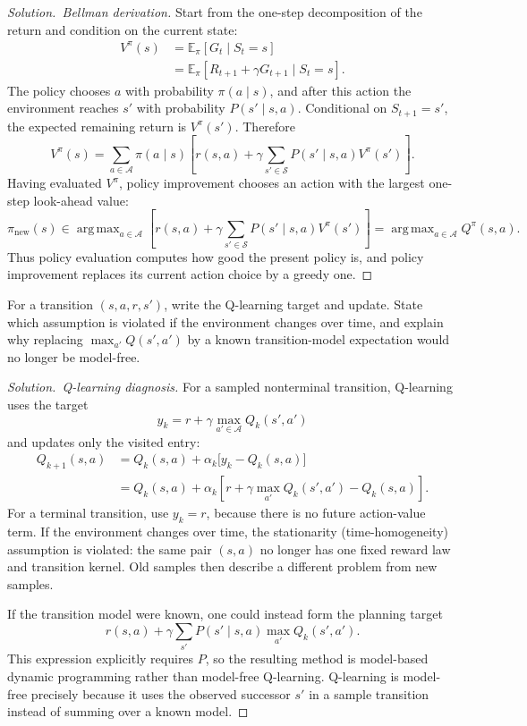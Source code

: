 \documentclass[11pt,a4paper]{article}
\DeclareMathOperator*{\argmax}{arg\,max}
\theoremstyle{definition}
\newenvironment{solution}[1][]{\begin{proof}[Solution.\ #1]}{\end{proof}}
\begin{document}
\begin{solution}[Bellman derivation]
Start from the one-step decomposition of the return and condition on the current state:
\[
\begin{aligned}
V^\pi(s)
&=\mathbb{E}_\pi[G_t\mid S_t=s]\\
&=\mathbb{E}_\pi[R_{t+1}+\gamma G_{t+1}\mid S_t=s].
\end{aligned}
\]
The policy chooses $a$ with probability $\pi(a\mid s)$, and after this action the
environment reaches $s'$ with probability $P(s'\mid s,a)$. Conditional on
$S_{t+1}=s'$, the expected remaining return is $V^\pi(s')$. Therefore
\[
V^\pi(s)
=\sum_{a\in\mathcal{A}}\pi(a\mid s)
\left[
r(s,a)+\gamma\sum_{s'\in\mathcal{S}}
P(s'\mid s,a)V^\pi(s')
\right].
\]
Having evaluated $V^\pi$, policy improvement chooses an action with the largest one-step
look-ahead value:
\[
\pi_{\mathrm{new}}(s)\in
\argmax_{a\in\mathcal{A}}
\left[
r(s,a)+\gamma\sum_{s'\in\mathcal{S}}
P(s'\mid s,a)V^\pi(s')
\right]
=\argmax_{a\in\mathcal{A}}Q^\pi(s,a).
\]
Thus policy evaluation computes how good the present policy is, and policy improvement
replaces its current action choice by a greedy one.
\end{solution}

\begin{exercise}
For a transition $(s,a,r,s')$, write the Q-learning target and update. State which
assumption is violated if the environment changes over time, and explain why replacing
$\max_{a'}Q(s',a')$ by a known transition-model expectation would no longer be model-free.
\end{exercise}

\begin{solution}[Q-learning diagnosis]
For a sampled nonterminal transition, Q-learning uses the target
\[
y_k=r+\gamma\max_{a'\in\mathcal{A}}Q_k(s',a')
\]
and updates only the visited entry:
\[
\begin{aligned}
Q_{k+1}(s,a)
&=Q_k(s,a)+\alpha_k\bigl[y_k-Q_k(s,a)\bigr]\\
&=Q_k(s,a)+\alpha_k
\left[r+\gamma\max_{a'}Q_k(s',a')-Q_k(s,a)\right].
\end{aligned}
\]
For a terminal transition, use $y_k=r$, because there is no future action-value term. If the
environment changes over time, the stationarity (time-homogeneity) assumption is violated:
the same pair $(s,a)$ no longer has one fixed reward law and transition kernel. Old samples
then describe a different problem from new samples.

If the transition model were known, one could instead form the planning target
\[
r(s,a)+\gamma\sum_{s'}P(s'\mid s,a)\max_{a'}Q_k(s',a').
\]
This expression explicitly requires $P$, so the resulting method is model-based dynamic
programming rather than model-free Q-learning. Q-learning is model-free precisely because it
uses the observed successor $s'$ in a sample transition instead of summing over a known model.
\end{solution}
\end{document}
